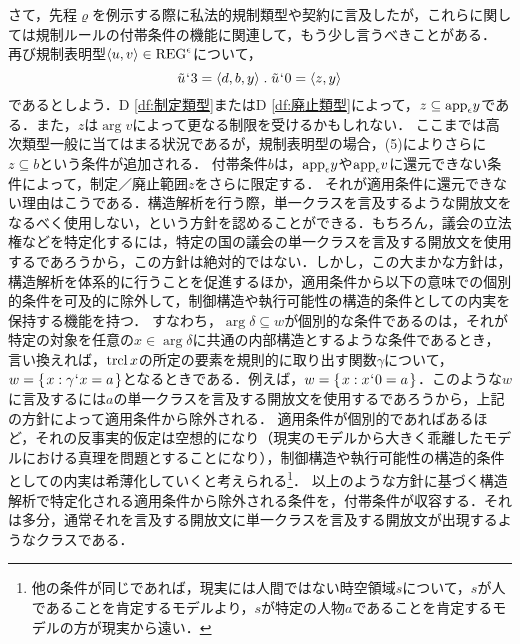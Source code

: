 さて，先程$ \varrho $を例示する際に私法的規制類型や契約に言及したが，これらに関しては規制ルールの付帯条件の機能に関連して，もう少し言うべきことがある．
再び規制表明型$ \langle u,v \rangle\in\mathrm{REG}^\epsilon $について，
\[
    \tilde{u}\fap 3 = \orp{d,b,y}\con{1}\tilde{u}\fap 0 = \orp{z,y}
\]
であるとしよう．D \ref{df:制定類型}またはD \ref{df:廃止類型}によって，$ z\subseteq \mathrm{app}_{\epsilon} y $である．また，$ z $は$ \arg v $によって更なる制限を受けるかもしれない．
ここまでは高次類型一般に当てはまる状況であるが，規制表明型の場合，(5)によりさらに$ z\subseteq b $という条件が追加される．
付帯条件$b$は，$\mathrm{app}_{\epsilon} y$や$\mathrm{app}_{\epsilon} v$に還元できない条件によって，制定／廃止範囲$z$をさらに限定する．
それが適用条件に還元できない理由はこうである．構造解析を行う際，単一クラスを言及するような開放文をなるべく使用しない，という方針を認めることができる．もちろん，議会の立法権などを特定化するには，特定の国の議会の単一クラスを言及する開放文を使用するであろうから，この方針は絶対的ではない．しかし，この大まかな方針は，構造解析を体系的に行うことを促進するほか，適用条件から以下の意味での個別的条件を可及的に除外して，制御構造や執行可能性の構造的条件としての内実を保持する機能を持つ．
すなわち，$ \arg\delta\subseteq w $が個別的な条件であるのは，それが特定の対象を任意の$ x\in \arg\delta $に共通の内部構造とするような条件であるとき，言い換えれば，$ \operatorname{trcl} x $の所定の要素を規則的に取り出す関数$ \gamma $について，$ w = \{\mspace{2mu}x:\gamma{\mspace{1mu}{`}\mspace{1mu}} x = a\mspace{2mu}\} $となるときである．例えば，$ w = \{\mspace{2mu}x:x{\mspace{1mu}{`}\mspace{1mu}} 0 = a\mspace{2mu}\} $．このような$w$に言及するには$a$の単一クラスを言及する開放文を使用するであろうから，上記の方針によって適用条件から除外される．
適用条件が個別的であればあるほど，それの反事実的仮定は空想的になり（現実のモデルから大きく乖離したモデルにおける真理を問題とすることになり），制御構造や執行可能性の構造的条件としての内実は希薄化していくと考えられる\footnote{他の条件が同じであれば，現実には人間ではない時空領域$s$について，$s$が人であることを肯定するモデルより，$s$が特定の人物$a$であることを肯定するモデルの方が現実から遠い．}．
以上のような方針に基づく構造解析で特定化される適用条件から除外される条件を，付帯条件が収容する．それは多分，通常それを言及する開放文に単一クラスを言及する開放文が出現するようなクラスである．

